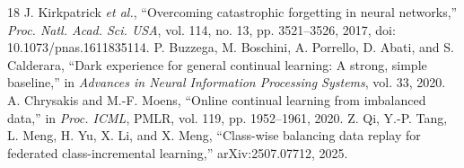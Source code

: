 \documentclass[journal,10pt]{IEEEtran}
\begin{document}
\begin{thebibliography}{18}
 J. Kirkpatrick \emph{et al.}, ``Overcoming catastrophic forgetting in neural networks,'' \emph{Proc. Natl. Acad. Sci. USA}, vol. 114, no. 13, pp. 3521--3526, 2017, doi: 10.1073/pnas.1611835114.
 P. Buzzega, M. Boschini, A. Porrello, D. Abati, and S. Calderara, ``Dark experience for general continual learning: A strong, simple baseline,'' in \emph{Advances in Neural Information Processing Systems}, vol. 33, 2020.
 A. Chrysakis and M.-F. Moens, ``Online continual learning from imbalanced data,'' in \emph{Proc. ICML}, PMLR, vol. 119, pp. 1952--1961, 2020.
 Z. Qi, Y.-P. Tang, L. Meng, H. Yu, X. Li, and X. Meng, ``Class-wise balancing data replay for federated class-incremental learning,'' arXiv:2507.07712, 2025.
\end{thebibliography}
\end{document}
